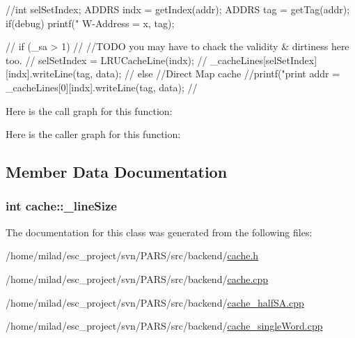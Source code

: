 \begin{DoxyCode}
{
    //int selSetIndex;
    ADDRS indx = getIndex(addr);
    ADDRS tag = getTag(addr);
    if(debug) printf("   W-Address = %
      x, tag);

//  if (_sa > 1) {
//      //TODO you may have to chack the validity & dirtiness here too.
//      selSetIndex = LRUCacheLine(indx);
//      _cacheLines[selSetIndex][indx].writeLine(tag, data);
//  } else {
        //Direct Map cache
        //printf("print addr = %
        _cacheLines[0][indx].writeLine(tag, data);
//  }
}
\end{DoxyCode}


Here is the call graph for this function:




Here is the caller graph for this function:




\subsection{Member Data Documentation}
\hypertarget{classcache_aab0a951069d47e9af2d349fb9eb92888}{
\subsubsection[{\_\-lineSize}]{\setlength{\rightskip}{0pt plus 5cm}int {\bf cache::\_\-lineSize}}}
\label{classcache_aab0a951069d47e9af2d349fb9eb92888}


The documentation for this class was generated from the following files:\begin{DoxyCompactItemize}
\item 
/home/milad/esc\_\-project/svn/PARS/src/backend/\hyperlink{cache_8h}{cache.h}\item 
/home/milad/esc\_\-project/svn/PARS/src/backend/\hyperlink{cache_8cpp}{cache.cpp}\item 
/home/milad/esc\_\-project/svn/PARS/src/backend/\hyperlink{cache__halfSA_8cpp}{cache\_\-halfSA.cpp}\item 
/home/milad/esc\_\-project/svn/PARS/src/backend/\hyperlink{cache__singleWord_8cpp}{cache\_\-singleWord.cpp}\end{DoxyCompactItemize}
